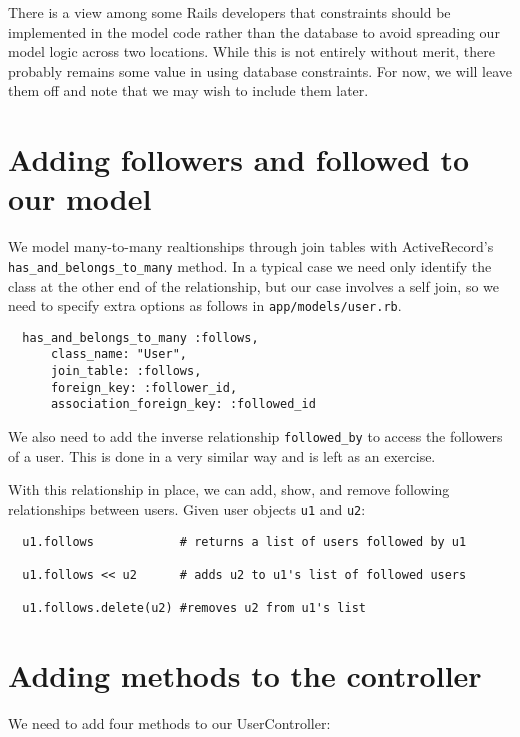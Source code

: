 \documentclass{article}
\begin{document}
There is a view among some Rails developers that constraints should be implemented in the model code rather than the database to avoid spreading our model logic across two locations.  While this is not entirely without merit, there probably remains some value in using database constraints.  For now, we will leave them off and note that we may wish to include them later.

\section{Adding followers and followed to our model}
We model many-to-many realtionships through join tables with ActiveRecord's \texttt{has\_and\_belongs\_to\_many} method.  In a typical case we need only identify the class at the other end of the relationship, but our case involves a self join, so we need to specify extra options as follows in \texttt{app/models/user.rb}.

\begin{verbatim}
  has_and_belongs_to_many :follows,
      class_name: "User",
      join_table: :follows,
      foreign_key: :follower_id,
      association_foreign_key: :followed_id
\end{verbatim}

We also need to add the inverse relationship \texttt{followed\_by} to access the followers of a user.  This is done in a very similar way and is left as an exercise.

With this relationship in place, we can add, show, and remove following relationships between users. Given user objects \texttt{u1} and \texttt{u2}:

\begin{verbatim}
  u1.follows            # returns a list of users followed by u1

  u1.follows << u2      # adds u2 to u1's list of followed users

  u1.follows.delete(u2) #removes u2 from u1's list
\end{verbatim}

\section{Adding methods to the controller}

We need to add four methods to our UserController:
\end{document}

